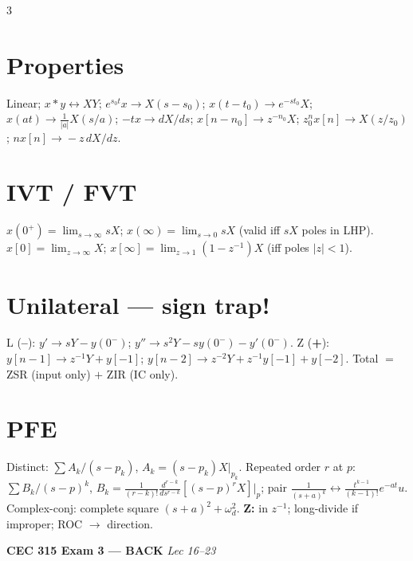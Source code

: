 \documentclass[8pt]{extarticle}
\begin{document}
\begin{multicols*}{3}
\section*{Properties}
Linear; $x*y\!\leftrightarrow\!XY$;
$e^{s_0t}x\!\to\!X(s{-}s_0)$;
$x(t{-}t_0)\!\to\!e^{-st_0}X$;
$x(at)\!\to\!\tfrac{1}{|a|}X(s/a)$;
$-tx\!\to\!dX/ds$;
$x[n{-}n_0]\!\to\!z^{-n_0}X$;
$z_0^n x[n]\!\to\!X(z/z_0)$;
$nx[n]\!\to\!-z\,dX/dz$.

\section*{IVT / FVT}
$x(0^+){=}\lim_{s\to\infty}sX$;
$x(\infty){=}\lim_{s\to 0}sX$ (valid iff $sX$ poles in LHP).
$x[0]{=}\lim_{z\to\infty}X$;
$x[\infty]{=}\lim_{z\to 1}(1{-}z^{-1})X$ (iff poles $|z|{<}1$).

\section*{Unilateral --- sign trap!}
L (\textbf{--}): $y'\!\to\!sY{-}y(0^-)$;
$y''\!\to\!s^2Y{-}sy(0^-){-}y'(0^-)$.
Z (\textbf{+}): $y[n{-}1]\!\to\!z^{-1}Y{+}y[-1]$;
$y[n{-}2]\!\to\!z^{-2}Y{+}z^{-1}y[-1]{+}y[-2]$.
Total $=$ ZSR (input only) $+$ ZIR (IC only).

\section*{PFE}
Distinct: $\sum A_k/(s{-}p_k)$, $A_k{=}(s{-}p_k)X|_{p_k}$.
Repeated order $r$ at $p$: $\sum B_k/(s{-}p)^k$, $B_k{=}\tfrac{1}{(r-k)!}\tfrac{d^{r-k}}{ds^{r-k}}[(s{-}p)^rX]|_p$; pair $\tfrac{1}{(s+a)^k}\!\leftrightarrow\!\tfrac{t^{k-1}}{(k-1)!}e^{-at}u$.
Complex-conj: complete square $(s{+}a)^2{+}\omega_d^2$.
\textbf{Z:} in $z^{-1}$; long-divide if improper; ROC $\to$ direction.

\end{multicols*}

\newpage

\begin{center}\textbf{\footnotesize CEC 315 Exam 3 --- BACK} \hfill \emph{Lec 16--23}\end{center}
\vspace{-4pt}
\end{document}
